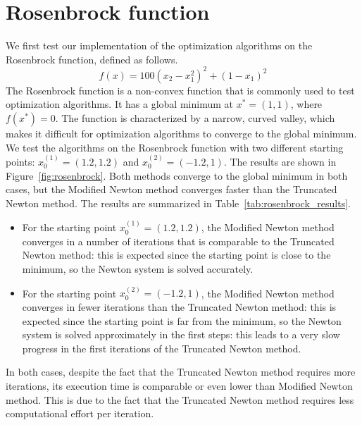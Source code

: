 \section{Rosenbrock function}
\label{sec:rosenbrock_results}

We first test our implementation of the optimization algorithms on the Rosenbrock function, defined as follows.
\begin{equation}
    f(x) = 100(x_2 - x_1^2)^2 + (1 - x_1)^2
\end{equation}
The Rosenbrock function is a non-convex function that is commonly used to test optimization algorithms. It has a global minimum at $x^* = (1, 1)$, where $f(x^*) = 0$. The function is characterized by a narrow, curved valley, which makes it difficult for optimization algorithms to converge to the global minimum.
We test the algorithms on the Rosenbrock function with two different starting points: $x_0^{(1)} = (1.2, 1.2)$ and $x_0^{(2)} = (-1.2, 1)$. The results are shown in Figure~\ref{fig:rosenbrock}.
Both methods converge to the global minimum in both cases, but the Modified Newton method converges faster than the Truncated Newton method. The results are summarized in Table~\ref{tab:rosenbrock_results}.
\begin{itemize}
    \item For the starting point $x_0^{(1)} = (1.2, 1.2)$, the Modified Newton method converges in a number of iterations that is comparable to the Truncated Newton method: this is expected since the starting point is close to the minimum, so the Newton system is solved accurately.
    \item For the starting point $x_0^{(2)} = (-1.2, 1)$, the Modified Newton method converges in fewer iterations than the Truncated Newton method: this is expected since the starting point is far from the minimum, so the Newton system is solved approximately in the first steps: this leads to a very slow progress in the first iterations of the Truncated Newton method.
\end{itemize}
In both cases, despite the fact that the Truncated Newton method requires more iterations, its execution time is comparable or even lower than Modified Newton method.
This is due to the fact that the Truncated Newton method requires less computational effort per iteration.
